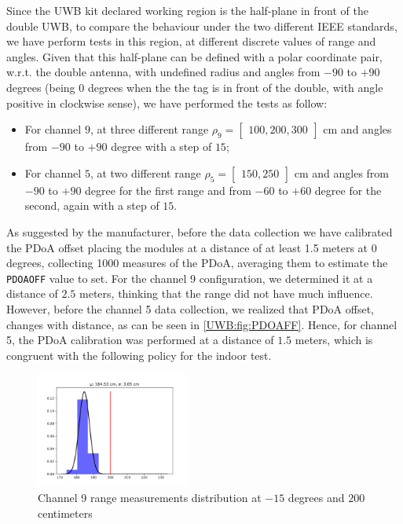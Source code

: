 Since the UWB kit declared working region is the half-plane in front of the double UWB, to compare the behaviour under the two different IEEE standards, we have perform tests in this region, at different discrete values of range and angles. Given that this half-plane can be defined with a polar coordinate pair, w.r.t. the double antenna, with undefined radius and angles from $-90$ to $+90$ degrees (being $0$ degrees when the the tag is in front of the double, with angle positive in clockwise sense), we have performed the tests as follow:
\begin{itemize}
    \item For channel $9$, at three different range $\rho_9=\begin{bmatrix} 100,200,300 \end{bmatrix}$ cm and angles from $-90$ to $+90$ degree with a step of $15$;
    \item For channel $5$, at two different range $\rho_5=\begin{bmatrix} 150, 250 \end{bmatrix}$ cm and angles from $-90$ to $+90$ degree for the first range and from $-60$ to $+60$ degree for the second, again with a step of $15$.
\end{itemize}

As suggested by the manufacturer, before the data collection we have calibrated the PDoA offset placing the modules at a distance of at least 1.5 meters at 0 degrees, collecting 1000 measures of the PDoA, averaging them to estimate the \texttt{PDOAOFF} value to set. For the channel 9 configuration, we determined it at a distance of $2.5$ meters, thinking that the range did not have much influence. However, before the channel 5 data collection, we realized that PDoA offset, changes with distance, as can be seen in \autoref{UWB:fig:PDOAFF}. Hence, for channel 5, the PDoA calibration was performed at a distance of $1.5$ meters, which is congruent with the following policy for the indoor test.\\

\begin{figure}
    \centering
    \includegraphics[width=0.45\textwidth]{images/characterization/ch9_range_hist.png}
    \caption{Channel 9 range measurements distribution at $-15$ degrees and $200$ centimeters}
    \label{UWB:fig:Range_ch9}
\end{figure}

